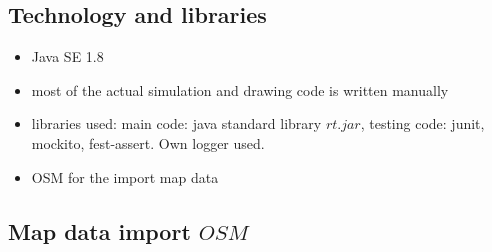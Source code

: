 \subsection{Technology and libraries}
\begin{itemize}
    \item Java SE 1.8
    \item most of the actual simulation and drawing code is written manually
    \item libraries used: main code: java standard library \(rt.jar\), testing code: junit, mockito, fest-assert. Own logger used.
    \item OSM for the import map data
\end{itemize}


\subsection{Map data import \(OSM\)}

